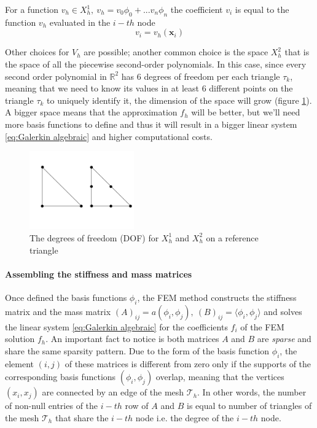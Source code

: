 \vspace{0.5cm}
\begin{remark}
	For a function $v_h \in X^1_h,\ v_h = v_0 \phi_0 +...  v_n \phi_n$ the coefficient $v_i$ is equal to the function $v_h$ evaluated in the $i-th$ node 
	\begin{equation}\label{eq:dof and values}
		v_i = v_h(\mathbf x_i)
	\end{equation}
\end{remark}\vspace{0.5cm}

Other choices for $V_h$ are possible; another common choice is the space $X_h^{2}$ that is the space of all the piecewise second-order polynomials. In this case, since every second order polynomial in $\mathbb R^2$ has 6 degrees of freedom per each triangle $\tau_k$, meaning that we need to know its values in at least 6 different points on the triangle $\tau_k$ to uniquely identify it, the dimension of the space will grow (figure \ref{fig:elements}). A bigger space means that the approximation $f_h$ will be better, but we'll need more basis functions to define and thus it will result in a bigger linear system \ref{eq:Galerkin algebraic} and higher computational costs.
\begin{figure}[h!]
	\begin{center}
		\includegraphics[width=0.4\textwidth]{figs/Chapter3/elemntsP1P2.png}
	\end{center}
	\caption{\label{fig:elements}The degrees of freedom (DOF) for $X_h^{1}$ and $X_h^{2}$ on a reference triangle}
\end{figure}
\paragraph{Assembling the stiffness and mass matrices}
Once defined the basis functions $\phi_i$, the FEM method constructs the stiffness matrix and the mass matrix $(A)_{ij} = a(\phi_i, \phi_j),\  (B)_{ij}=\langle\phi_i,\phi_j\rangle$ and solves the linear system \ref{eq:Galerkin algebraic} for the coefficients $f_i$ of the FEM solution $f_h$. An important fact to notice is both matrices $A$ and $B$ are \textit{sparse} and share the same sparsity pattern. Due to the form of the basis function $\phi_i$, the element $(i, j)$ of these matrices is different from zero only if the supports of the corresponding basis functions $(\phi_i, \phi_j)$ overlap, meaning that the vertices $(x_i, x_j)$ are connected by an edge of the mesh $\mathcal T_h$. In other words, the number of non-null entries of the $i-th$ row of $A$ and $B$ is equal to number of triangles of the mesh $\mathcal T_h$ that share the $i-th$ node i.e. the degree of the $i-th$ node.

